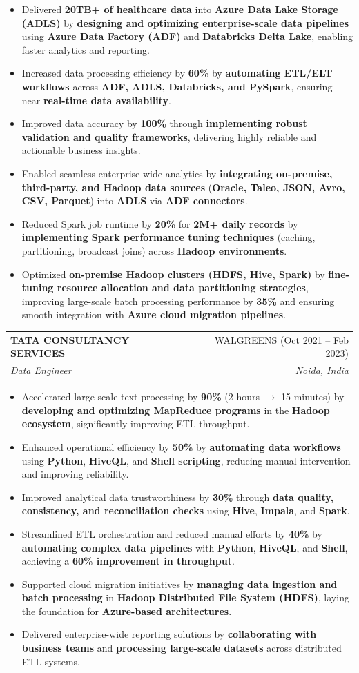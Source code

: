 \documentclass[letterpaper,11pt]{article}
\makeatletter
\newcommand{\resumeItem}[1]{
  \item\small{
    {#1 \vspace{-2pt}}
  }
}
\newcommand{\resumeSubheading}[4]{
  \vspace{-2pt}\item
    \begin{tabular*}{0.97\textwidth}[t]{l@{\extracolsep{\fill}}r}
      \textbf{#1} & #2 \\
      \textit{\small#3} & \textit{\small #4} \\
    \end{tabular*}\vspace{-7pt}
}
\newcommand{\resumeItemListStart}{\begin{itemize}}
\newcommand{\resumeItemListEnd}{\end{itemize}\vspace{-5pt}}
\makeatother
\begin{document}
    \resumeItemListStart
      \resumeItem{Delivered \textbf{20TB+ of healthcare data} into \textbf{Azure Data Lake Storage (ADLS)} by \textbf{designing and optimizing enterprise-scale data pipelines} using \textbf{Azure Data Factory (ADF)} and \textbf{Databricks Delta Lake}, enabling faster analytics and reporting.}
      \resumeItem{Increased data processing efficiency by \textbf{60\%} by \textbf{automating ETL/ELT workflows} across \textbf{ADF, ADLS, Databricks, and PySpark}, ensuring near \textbf{real-time data availability}.}
      \resumeItem{Improved data accuracy by \textbf{100\%} through \textbf{implementing robust validation and quality frameworks}, delivering highly reliable and actionable business insights.}
      \resumeItem{Enabled seamless enterprise-wide analytics by \textbf{integrating on-premise, third-party, and Hadoop data sources} (\textbf{Oracle, Taleo, JSON, Avro, CSV, Parquet}) into \textbf{ADLS} via \textbf{ADF connectors}.}
      \resumeItem{Reduced Spark job runtime by \textbf{20\%} for \textbf{2M+ daily records} by \textbf{implementing Spark performance tuning techniques} (caching, partitioning, broadcast joins) across \textbf{Hadoop environments}.}
      \resumeItem{Optimized \textbf{on-premise Hadoop clusters (HDFS, Hive, Spark)} by \textbf{fine-tuning resource allocation and data partitioning strategies}, improving large-scale batch processing performance by \textbf{35\%} and ensuring smooth integration with \textbf{Azure cloud migration pipelines}.}
    \resumeItemListEnd

  \resumeSubheading
    {TATA CONSULTANCY SERVICES}{WALGREENS (Oct 2021 -- Feb 2023)}
    {Data Engineer}{Noida, India}

    \resumeItemListStart
      \resumeItem{Accelerated large-scale text processing by \textbf{90\%} (2 hours $\rightarrow$ 15 minutes) by \textbf{developing and optimizing MapReduce programs} in the \textbf{Hadoop ecosystem}, significantly improving ETL throughput.}
      \resumeItem{Enhanced operational efficiency by \textbf{50\%} by \textbf{automating data workflows} using \textbf{Python}, \textbf{HiveQL}, and \textbf{Shell scripting}, reducing manual intervention and improving reliability.}
      \resumeItem{Improved analytical data trustworthiness by \textbf{30\%} through \textbf{data quality, consistency, and reconciliation checks} using \textbf{Hive}, \textbf{Impala}, and \textbf{Spark}.}
      \resumeItem{Streamlined ETL orchestration and reduced manual efforts by \textbf{40\%} by \textbf{automating complex data pipelines} with \textbf{Python}, \textbf{HiveQL}, and \textbf{Shell}, achieving a \textbf{60\% improvement in throughput}.}
      \resumeItem{Supported cloud migration initiatives by \textbf{managing data ingestion and batch processing} in \textbf{Hadoop Distributed File System (HDFS)}, laying the foundation for \textbf{Azure-based architectures}.}
      \resumeItem{Delivered enterprise-wide reporting solutions by \textbf{collaborating with business teams} and \textbf{processing large-scale datasets} across distributed ETL systems.}
    \resumeItemListEnd
\end{document}
